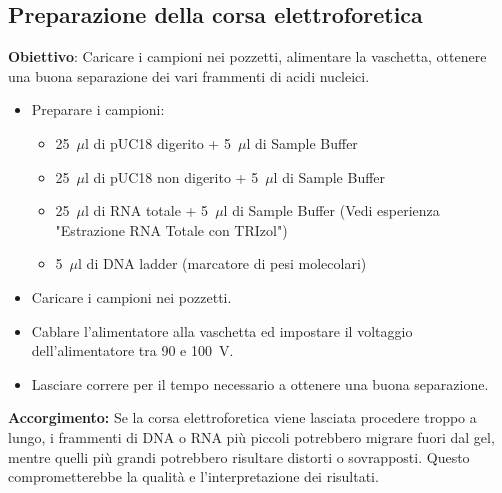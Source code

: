 \begin{noSplitBlock}
  \subsection{Preparazione della corsa elettroforetica}

      {\footnotesize \textbf{Obiettivo}: Caricare i campioni nei pozzetti, alimentare la vaschetta, ottenere una buona separazione dei vari frammenti di acidi nucleici.}

      \begin{itemize}
          \item Preparare i campioni:
          \begin{itemize}
              \item 25~$\mu$l di pUC18 digerito + 5~$\mu$l di Sample Buffer
              \item 25~$\mu$l di pUC18 non digerito + 5~$\mu$l di Sample Buffer
              \item 25~$\mu$l di RNA totale + 5~$\mu$l di Sample Buffer (Vedi esperienza "Estrazione RNA Totale con TRIzol")
              \item 5~$\mu$l di DNA ladder (marcatore di pesi molecolari)
          \end{itemize}
          \item Caricare i campioni nei pozzetti.
          \item Cablare l'alimentatore alla vaschetta ed impostare il voltaggio dell’alimentatore tra 90 e 100~V.
          \item Lasciare correre per il tempo necessario a ottenere una buona separazione.
      \end{itemize}

    \begin{accorgimentoBox}
      \textbf{Accorgimento:} Se la corsa elettroforetica viene lasciata procedere troppo a lungo, i frammenti di DNA o RNA più piccoli potrebbero migrare fuori dal gel, mentre quelli più grandi potrebbero risultare distorti o sovrapposti. Questo comprometterebbe la qualità e l’interpretazione dei risultati.
    \end{accorgimentoBox}
    \end{noSplitBlock}

